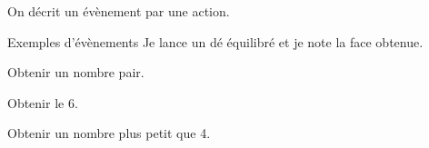 \begin{pageCours}
\begin{Rq}
On décrit un évènement par une action.
\end{Rq}


\begin{ExT}{Exemples d'évènements}
Je lance un dé équilibré et je note la face obtenue. 
\begin{description}
\item Obtenir un nombre pair.
\item Obtenir le 6.
\item Obtenir un nombre plus petit que 4.
\end{description}
\end{ExT}

\end{pageCours}


